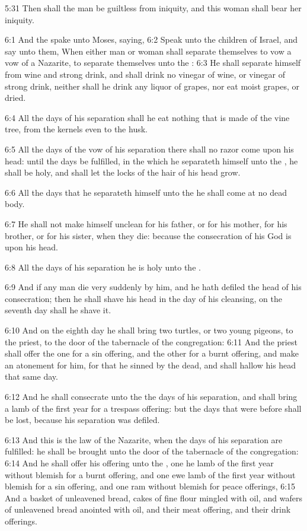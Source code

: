 5:31 Then shall the man be guiltless from iniquity, and this woman shall bear her iniquity.

6:1 And the \LORD spake unto Moses, saying, 6:2 Speak unto the children of Israel, and say unto them, When either man or woman shall separate themselves to vow a vow of a Nazarite, to separate themselves unto the \LORD: 6:3 He shall separate himself from wine and strong drink, and shall drink no vinegar of wine, or vinegar of strong drink, neither shall he drink any liquor of grapes, nor eat moist grapes, or dried.

6:4 All the days of his separation shall he eat nothing that is made of the vine tree, from the kernels even to the husk.

6:5 All the days of the vow of his separation there shall no razor come upon his head: until the days be fulfilled, in the which he separateth himself unto the \LORD, he shall be holy, and shall let the locks of the hair of his head grow.

6:6 All the days that he separateth himself unto the \LORD he shall come at no dead body.

6:7 He shall not make himself unclean for his father, or for his mother, for his brother, or for his sister, when they die: because the consecration of his God is upon his head.

6:8 All the days of his separation he is holy unto the \LORD.

6:9 And if any man die very suddenly by him, and he hath defiled the head of his consecration; then he shall shave his head in the day of his cleansing, on the seventh day shall he shave it.

6:10 And on the eighth day he shall bring two turtles, or two young pigeons, to the priest, to the door of the tabernacle of the congregation: 6:11 And the priest shall offer the one for a sin offering, and the other for a burnt offering, and make an atonement for him, for that he sinned by the dead, and shall hallow his head that same day.

6:12 And he shall consecrate unto the \LORD the days of his separation, and shall bring a lamb of the first year for a trespass offering: but the days that were before shall be lost, because his separation was defiled.

6:13 And this is the law of the Nazarite, when the days of his separation are fulfilled: he shall be brought unto the door of the tabernacle of the congregation: 6:14 And he shall offer his offering unto the \LORD, one he lamb of the first year without blemish for a burnt offering, and one ewe lamb of the first year without blemish for a sin offering, and one ram without blemish for peace offerings, 6:15 And a basket of unleavened bread, cakes of fine flour mingled with oil, and wafers of unleavened bread anointed with oil, and their meat offering, and their drink offerings.


